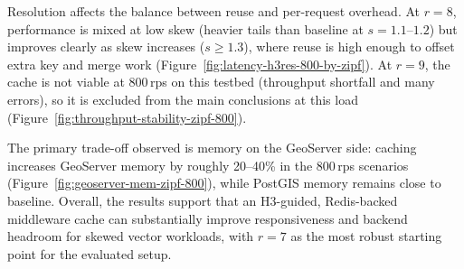 Resolution affects the balance between reuse and per-request overhead. At $r{=}8$, performance is mixed at low skew (heavier tails than baseline at $s{=}1.1$--$1.2$) but improves clearly as skew increases ($s{\ge}1.3$), where reuse is high enough to offset extra key and merge work (Figure~\ref{fig:latency-h3res-800-by-zipf}). At $r{=}9$, the cache is not viable at 800\,\ac{rps} on this testbed (throughput shortfall and many errors), so it is excluded from the main conclusions at this load (Figure~\ref{fig:throughput-stability-zipf-800}).

The primary trade-off observed is memory on the GeoServer side: caching increases GeoServer memory by roughly 20--40\% in the 800\,\ac{rps} scenarios (Figure~\ref{fig:geoserver-mem-zipf-800}), while PostGIS memory remains close to baseline. Overall, the results support that an H3-guided, Redis-backed middleware cache can substantially improve responsiveness and backend headroom for skewed vector workloads, with $r{=}7$ as the most robust starting point for the evaluated setup.
